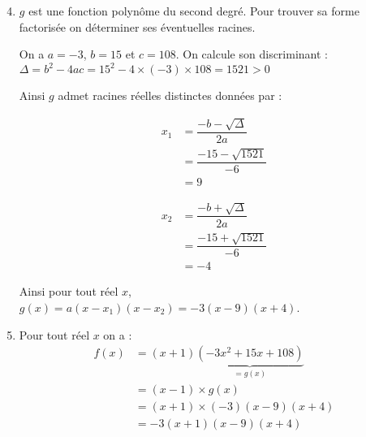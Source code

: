 \documentclass[15pt, mathserif]{beamer}
\begin{document}
 \begin{frame} 
 \begin{enumerate} 
 \setcounter{enumi}{3} 
 	\item $g$ est une fonction polynôme du second degré. Pour trouver sa forme factorisée on déterminer ses éventuelles racines.
 
 On a $a=-3$, $b=15$ et $c=108$. On calcule son discriminant : \hfil $\Delta=b^2-4ac= 15^2 -4 \times \left(-3\right) \times 108= 1521 >0$ 
 
 Ainsi $g$ admet racines réelles distinctes données par : \begin{minipage}{0.45\linewidth} 
 \begin{align*} 
 x_1 &= \dfrac{-b-\sqrt{\Delta}}{2a} \\ 
 &= \dfrac{-15-\sqrt{1521}}{-6} \\ 
 &= 9\end{align*} 
 \end{minipage} 
 \hfil \begin{minipage}{0.45\linewidth} 
 \begin{align*}x_2 &= \dfrac{-b+\sqrt{\Delta}}{2a} \\ 
 &= \dfrac{-15+\sqrt{1521}}{-6} \\ 
 &= -4
 \end{align*} 
 \end{minipage} 
 
 Ainsi pour tout réel $x$, $g(x)=a(x-x_1)(x-x_2)= -3\left(x-9\right)\left(x+4 \right)$. 
 \end{enumerate}
 \end{frame} 
 \begin{frame} 
 \begin{enumerate} 
 \setcounter{enumi}{4} 
 	 \item Pour tout réel $x$ on a :
 \begin{align*} 
 f(x)&=(x+1)\underbrace{(-3x^2+15x+108)}_{=g(x)} \\ 
   &= (x-1) \times g(x) \\ 
  &= (x+1) \times \left(-3\right)\left(x-9\right)\left(x+4 \right) \\ 
 &= -3(x+1)\left(x-9\right)\left(x+4 \right)
   \end{align*}
 \end{enumerate} 
 
 \end{frame}
\end{document}
